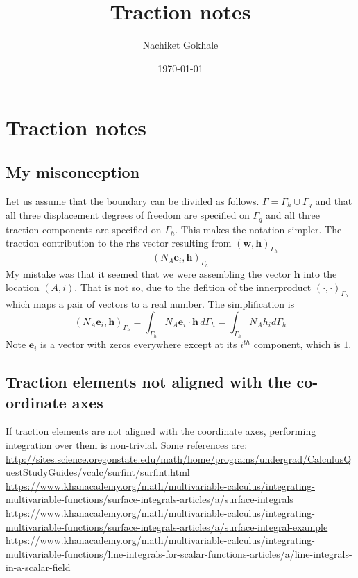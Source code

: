 \documentclass{article}
\newcommand{\beq}{\begin{equation}}
\newcommand{\eeq}{\end{equation}}
\begin{document}
\title{Traction notes}
\author{Nachiket Gokhale}
\date{\today}
\maketitle
\section{Traction notes}
\subsection{My misconception}
Let us assume that the boundary can be divided as follows. $\Gamma=\Gamma_h\cup\Gamma_q$ and that all three displacement degrees of freedom are specified on $\Gamma_q$ and all three traction components are specified on $\Gamma_h$. This makes the notation simpler. The traction contribution to the rhs vector resulting from $(\mathbf{w},\mathbf{h})_{\Gamma_h}$
\beq
(N_A\mathbf{e}_{i},\mathbf{h})_{\Gamma_h}
\eeq
My mistake was that it seemed that we were assembling the vector $\mathbf{h}$ into the location $(A,i)$. That is not so, due to the defition of the innerproduct $(\cdot,\cdot)_{\Gamma_h}$ which maps a pair of vectors to a real number. The simplification is
\beq
(N_A\mathbf{e}_{i},\mathbf{h})_{\Gamma_h} = \int_{\Gamma_h} N_{A}\mathbf{e}_{i}\cdot\mathbf{h}\,d\Gamma_{h} = \int_{\Gamma_h}N_Ah_id\Gamma_{h}
\eeq
Note $\mathbf{e}_{i}$ is a vector with zeros everywhere except at its $i^{th}$ component, which is $1$.
\subsection{Traction elements not aligned with the co-ordinate axes}
If traction elements are not aligned with the coordinate axes, performing integration over them is non-trivial. Some references are:\\
\url{http://sites.science.oregonstate.edu/math/home/programs/undergrad/CalculusQuestStudyGuides/vcalc/surfint/surfint.html}\\
\url{https://www.khanacademy.org/math/multivariable-calculus/integrating-multivariable-functions/surface-integrals-articles/a/surface-integrals}\\
\url{https://www.khanacademy.org/math/multivariable-calculus/integrating-multivariable-functions/surface-integrals-articles/a/surface-integral-example}\\
\url{https://www.khanacademy.org/math/multivariable-calculus/integrating-multivariable-functions/line-integrals-for-scalar-functions-articles/a/line-integrals-in-a-scalar-field}
\end{document}
